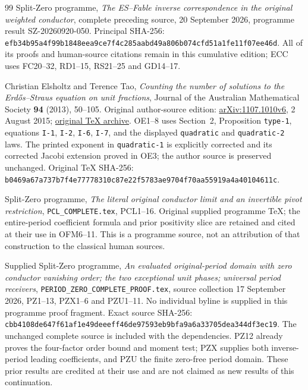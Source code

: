 \documentclass[11pt]{article}
\begin{document}
\begin{thebibliography}{99}
 Split-Zero programme,
\emph{The ES--Fable inverse correspondence in the original weighted
conductor}, complete preceding source, 20 September 2026,
programme result SZ-20260920-050. Principal SHA-256:
\texttt{efb34b95a4f99b1848eea9ce7f4c285aabd49a806b074cfd51a1fe11f07ee46d}.
All of its proofs and human-source citations remain in this cumulative
edition; ECC uses FC20--32, RD1--15, RS21--25 and GD14--17.


 Christian Elsholtz and Terence Tao,
\emph{Counting the number of solutions to the Erd\H{o}s--Straus
equation on unit fractions}, Journal of the Australian Mathematical
Society \textbf{94} (2013), 50--105. Original author-source edition:
\href{https://arxiv.org/abs/1107.1010v6}{arXiv:1107.1010v6},
2 August 2015; \href{https://arxiv.org/src/1107.1010v6}{original TeX archive}.
OE1--8 uses Section~2, Proposition \texttt{type-1}, equations
\texttt{I-1}, \texttt{I-2}, \texttt{I-6}, \texttt{I-7},
and the displayed \texttt{quadratic} and \texttt{quadratic-2} laws.
The printed exponent in \texttt{quadratic-1} is explicitly corrected
and its corrected Jacobi extension proved in OE3; the author source
is preserved unchanged. Original TeX SHA-256:
\texttt{b0469a67a737b7f4e77778310c87e22f5783ae9704f70aa55919a4a40104611c}.


 Split-Zero programme,
\emph{The literal original conductor limit and an invertible pivot restriction},
\texttt{PCL\_COMPLETE.tex}, PCL1--16. Original supplied programme TeX;
the entire-period coefficient formula and prior positivity slice are
retained and cited at their use in OFM6--11. This is a programme source,
not an attribution of that construction to the classical human sources.


 Supplied Split-Zero programme,
\emph{An evaluated original-period domain with zero conductor vanishing
order; the two exceptional unit phases; universal period receivers},
\texttt{PERIOD\_ZERO\_COMPLETE\_PROOF.tex}, source collection
17 September 2026, PZ1--13, PZX1--6 and PZU1--11.
No individual byline is supplied in this programme proof fragment.
Exact source SHA-256:
\texttt{cbb4108de647f61af1e49deeeff46de97593eb9bfa9a6a33705dea344df3ec19}.
The unchanged complete source is included with the dependencies.
PZ12 already proves the four-factor order bound and moment test;
PZX supplies both inverse-period leading coefficients, and PZU the
finite zero-free period domain. These prior results are credited
at their use and are not claimed as new results of this continuation.

\end{thebibliography}
\end{document}
